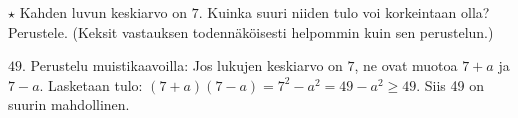 \begin{tehtavasivu}
\begin{tehtava}  %
    $\star$ Kahden luvun keskiarvo on $7$. Kuinka suuri niiden tulo voi korkeintaan olla? Perustele. (Keksit vastauksen todennäköisesti helpommin kuin sen perustelun.)
    \begin{vastaus}
        $49$. Perustelu muistikaavoilla: Jos lukujen keskiarvo on $7$, ne ovat muotoa $7+a$ ja $7-a$. Lasketaan tulo: $(7+a)(7-a)=7^2-a^2 = 49-a^2 \geq 49$. Siis 49 on suurin mahdollinen.
    \end{vastaus}
\end{tehtava}

\end{tehtavasivu}
